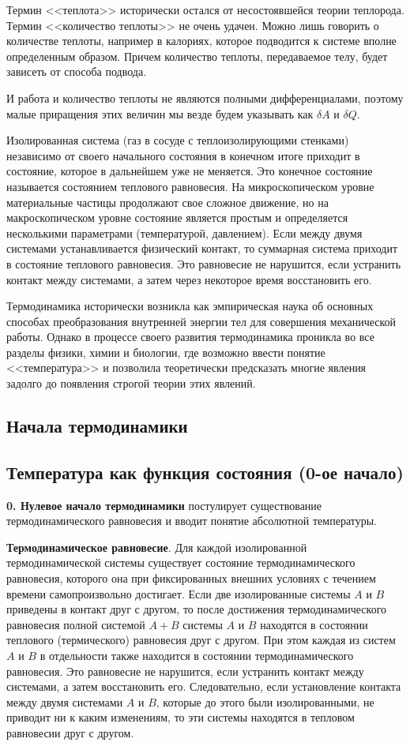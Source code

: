 \documentclass[12pt,a4paper,oneside]{book}
\begin{document}
Термин <<теплота>> исторически остался от несостоявшейся теории теплорода. Термин <<количество теплоты>> не очень удачен. Можно лишь говорить о количестве теплоты, например в калориях, которое подводится к системе вполне определенным образом. Причем количество теплоты, передаваемое телу, будет зависеть от способа подвода.

И работа и количество теплоты не являются полными дифференциалами, поэтому малые приращения этих величин мы везде будем указывать как $\delta A$ и $\delta Q$.


Изолированная система (газ в сосуде с теплоизолирующими стенками) независимо от своего начального состояния в конечном итоге приходит в состояние, которое в дальнейшем уже не меняется. Это конечное состояние называется состоянием теплового равновесия. На микроскопическом уровне материальные частицы продолжают свое сложное движение, но на макроскопическом уровне состояние является простым и определяется несколькими параметрами (температурой, давлением). Если между двумя системами устанавливается физический контакт, то суммарная система приходит в состояние теплового равновесия. Это равновесие не нарушится, если устранить контакт между системами, а затем через некоторое время восстановить его.

Термодинамика исторически возникла как эмпирическая наука об основных способах преобразования внутренней энергии тел для совершения механической работы. Однако в процессе своего развития термодинамика проникла во все разделы физики, химии и биологии, где возможно ввести понятие <<температура>> и позволила теоретически предсказать многие явления задолго до появления строгой теории этих явлений.


\subsection{Начала термодинамики}

\subsection{Температура как функция состояния (0-ое начало)}

{\bf 0. Нулевое начало термодинамики} постулирует существование термодинамического равновесия и вводит понятие абсолютной температуры.

{\bf Термодинамическое равновесие}. Для каждой изолированной термодинамической системы существует состояние термодинамического равновесия, которого она при фиксированных внешних условиях с течением времени самопроизвольно достигает. Если две изолированные системы $A$ и $B$ приведены в контакт друг с другом, то после достижения термодинамического равновесия полной системой $A+B$ системы $A$ и $B$ находятся в состоянии теплового (термического) равновесия друг с другом. При этом каждая из систем $A$ и $B$ в отдельности также находится в состоянии термодинамического равновесия. Это равновесие не нарушится, если устранить контакт между системами, а затем восстановить его. Следовательно, если установление контакта между двумя системами $A$ и $B$, которые до этого были изолированными, не приводит ни к каким изменениям, то эти системы находятся в тепловом равновесии друг с другом.
\end{document}
